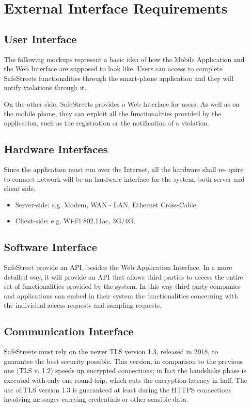 \section{External Interface Requirements}

\subsection{User Interface}
The following mockups represent a basic idea of how the Mobile Application
and the Web Interface are supposed to look like.
Users can access to complete SafeStreets functionalities through the smart-phone application and they will notify violations through it.

On the other side, SafeStreets provides a Web Interface for users. As well as on the mobile phone, 
they can exploit all the functionalities provided by the application, such as the registration or the notification of a violation.

\subsection{Hardware Interfaces}
Since the application must run over the Internet, all the hardware shall re-
quire to connect network will be an hardware interface for the system, both
server and client side.
\begin{itemize}
  \item Server-side: e.g. Modem, WAN - LAN, Ethernet Cross-Cable.
  \item Client-side: e.g. Wi-Fi 802.11ac, 3G/4G. 
\end{itemize}


\subsection{Software Interface}
SafeStreet provide an API, besides the Web Application Interface.
In a more detailed way, it will provide an API that allows third parties to access
the entire set of functionalities provided by the system. In this way 
third party companies and applications can embed in their system the
functionalities concerning with the individual access requests and sampling
requests.

\subsection{Communication Interface}
SafeStreets must rely on the newer TLS version 1.3, released in 2018, to guarantee the best
security possible. This version, in comparison to the previous one (TLS v. 1.2) speeds up encrypted connections;
in fact the handshake phase is executed with only one round-trip, which cuts the encryption latency in half.
The use of TLS version 1.3 is guaranteed at least during the HTTPS connections involving messages
carrying credentials or other sensible data.
